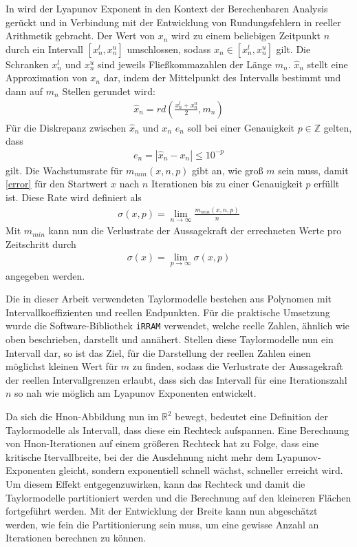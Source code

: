 In \cite{DBLP:spandl} wird der Lyapunov Exponent in den Kontext der Berechenbaren Analysis gerückt und in Verbindung mit der Entwicklung von Rundungsfehlern in reeller Arithmetik gebracht. Der Wert von $x_n$ wird zu einem beliebigen Zeitpunkt $n$ durch ein Intervall $[x_n^l,x_n^u]$ umschlossen, sodass $x_n \in [x_n^l,x_n^u]$ gilt. Die Schranken $x_n^l$ und $x_n^u$ sind jeweils Fließkommazahlen der Länge $m_n$. $\hat{x}_n$ stellt eine Approximation von $x_n$ dar, indem der Mittelpunkt des Intervalls bestimmt und dann auf $m_n$ Stellen gerundet wird:
\begin{align}
 \hat{x}_n = rd(\frac{x^l_n + x^u_n}{2}, m_n)
\end{align}
Für die Diskrepanz zwischen $\hat{x}_n$ und $x_n$ $e_n$ soll bei einer Genauigkeit $p \in \mathbb{Z}$ gelten, dass
\begin{align}
\label{error}
 e_n = |\hat{x}_n - x_n| \leq 10^{-p}
\end{align}
gilt. Die Wachstumsrate für $m_{min}(x,n,p)$ gibt an, wie groß $m$ sein muss, damit \ref{error} für den Startwert $x$ nach $n$ Iterationen bis zu einer Genauigkeit $p$ erfüllt ist. Diese Rate wird definiert als
\begin{align}
 \sigma(x,p) = \lim_{n \rightarrow \infty} \frac{m_{min}(x,n,p)}{n}
\end{align}
Mit $m_{min}$ kann nun die Verlustrate der Aussagekraft der errechneten Werte pro Zeitschritt durch
\begin{align}
 \sigma(x) = \lim_{p \rightarrow \infty} \sigma(x,p)
\end{align}
angegeben werden. 

Die in dieser Arbeit verwendeten Taylormodelle bestehen aus Polynomen mit Intervallkoeffizienten und reellen Endpunkten. Für die praktische Umsetzung wurde die Software-Bibliothek \verb+iRRAM+ \cite{Mller2009EnhancingIE} verwendet, welche reelle Zahlen, ähnlich wie oben beschrieben, darstellt und annähert. Stellen diese Taylormodelle nun ein Intervall dar, so ist das Ziel, für die Darstellung der reellen Zahlen einen möglichst kleinen Wert für $m$ zu finden, sodass die Verlustrate der Aussagekraft der reellen Intervallgrenzen erlaubt, dass sich das Intervall für eine Iterationszahl $n$ so nah wie möglich am Lyapunov Exponenten entwickelt. 

Da sich die H\e non-Abbildung nun im $\mathbb{R}^2$ bewegt, bedeutet eine Definition der Taylormodelle als Intervall, dass diese ein Rechteck aufspannen. Eine Berechnung von H\e non-Iterationen auf einem größeren Rechteck hat zu Folge, dass eine kritische Itervallbreite, bei der die Ausdehnung nicht mehr dem Lyapunov-Exponenten gleicht, sondern exponentiell schnell wächst, schneller erreicht wird. Um diesem Effekt entgegenzuwirken, kann das Rechteck und damit die Taylormodelle partitioniert werden und die Berechnung auf den kleineren Flächen fortgeführt werden. Mit der Entwicklung der Breite kann nun abgeschätzt werden, wie fein die Partitionierung sein muss, um eine gewisse Anzahl an Iterationen berechnen zu können.


 



 
